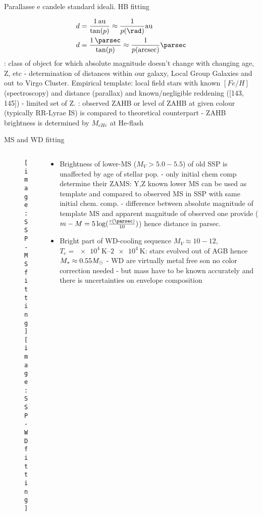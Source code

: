 \begin{frame}{Parallasse e candele standard ideali. HB fitting}

\begin{align*}
&d=\frac{\SI{1}{\astronomicalunit}}{\tan(p)}\approx\frac{1}{p(\si{\rad})}\si{\astronomicalunit}\\
&d=\frac{\SI{1}{\parsec}}{\tan(p)}\approx\frac{1}{p(\si{\arcsec})}\si{\parsec}
\end{align*}
: class of object for which absolute magnitude doesn't change with changing age, Z, etc - determination of distances within our galaxy, Local Group Galaxies and out to Virgo Cluster.
Empirical template: local field stars with known $[Fe/H]$ (spectroscopy) and distance (parallax) and known/negligible reddening ([143, 145]) - limited set of Z.
: observed ZAHB or level of ZAHB at given colour (typically RR-Lyrae IS) is compared to theoretical counterpart - ZAHB brightness is determined by $M_{cHe}$ at He-flash
\end{frame}

\begin{frame}{MS and WD fitting}
\begin{columns}[T]
	\begin{column}{0.45\textwidth}
		\begin{figure}[!ht]
			\texttt{[image: SSP-MSfitting]}\label{fig:SSP-MSfitting}
			\texttt{[image: SSP-WDfitting]}\label{fig:SSP-WDfitting}
		\end{figure}
	\end{column}
	\begin{column}{0.45\textwidth}
		\begin{itemize}
			\item Brightness of lower-MS ($M_V>5.0-5.5$) of old SSP is unaffected by age of stellar pop. - only initial chem comp determine their ZAMS: Y,Z known lower MS can be used as template and compared to observed MS in SSP with same initial chem. comp. - difference between absolute magnitude of template MS and apparent magnitude of observed one provide  ($m-M=5\log(\frac{r(\si{\parsec})}{10})$) hence distance in parsec.
			\item Bright part of WD-cooling sequence $M_V\approx10-12$, $T_e=\SIrange{e4}{2e4}{\kelvin}$: stars evolved out of AGB hence $M_*\approx0.55M_{\odot}$ - WD are virtually metal free son no color correction needed - but mass have to be known accurately and there is uncertainties on envelope composition
		\end{itemize}
	\end{column}
\end{columns}
\end{frame}

